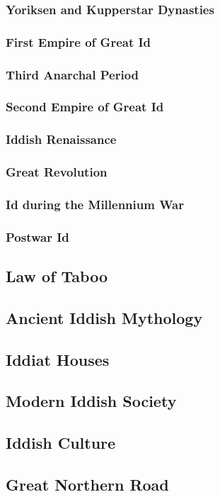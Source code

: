 \begin{multicols}{2}
		\subsubsection{Yoriksen and Kupperstar Dynasties}\par
		\subsubsection{First Empire of Great Id}\par
		\subsubsection{Third Anarchal Period}\par
		\subsubsection{Second Empire of Great Id}\par
		\subsubsection{Iddish Renaissance}\par
		\subsubsection{Great Revolution}\par
		\subsubsection{Id during the Millennium War}\par
		\subsubsection{Postwar Id}\par
	\subsection{Law of Taboo}
	\subsection{Ancient Iddish Mythology}
	\subsection{Iddiat Houses}
	\subsection{Modern Iddish Society}
	\subsection{Iddish Culture}
	\subsection{Great Northern Road}
\end{multicols}